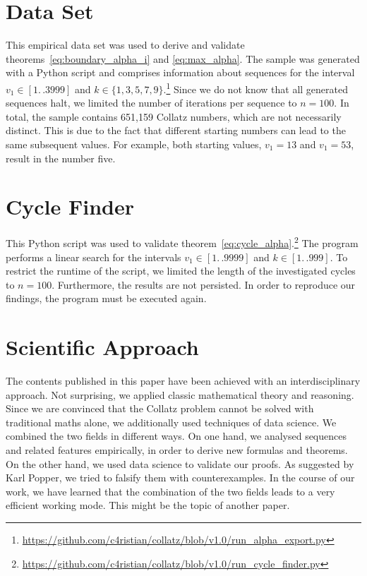 \documentclass{SciPress_2015}
\begin{document}
\section{Data Set}
\label{appx:data_set}
This empirical data set was used to derive and validate theorems~\ref{eq:boundary_alpha_i} and \ref{eq:max_alpha}. The sample was generated with a Python script and comprises information about sequences for the interval $v_1\in[1\mathrel{{.}\,{.}}3999]$ and $k\in\{1,3,5,7,9\}$.\footnote{\url{https://github.com/c4ristian/collatz/blob/v1.0/run_alpha_export.py}} Since we do not know that all generated sequences halt, we limited the number of iterations per sequence to $n=100$. In total, the sample contains 651,159 Collatz numbers, which are not necessarily distinct. This is due to the fact that different starting numbers can lead to the same subsequent values. For example, both starting values, $v_1=13$ and $v_1=53$, result in the number five.

\section{Cycle Finder}
\label{appx:cycle_finder}
This Python script was used to validate theorem~\ref{eq:cycle_alpha}.\footnote{\url{https://github.com/c4ristian/collatz/blob/v1.0/run_cycle_finder.py}} The program performs a linear search for the intervals $v_1\in[1\mathrel{{.}\,{.}}9999]$ and $k\in[1\mathrel{{.}\,{.}}999]$. To restrict the runtime of the script, we limited the length of the investigated cycles to $n=100$. Furthermore, the results are not persisted. In order to reproduce our findings, the program must be executed again.

\section{Scientific Approach}
\label{appx:scientific_approach}
The contents published in this paper have been achieved with an interdisciplinary approach. Not surprising, we applied classic mathematical theory and reasoning. Since we are convinced that the Collatz problem cannot be solved with traditional maths alone, we additionally used techniques of data science. We combined the two fields in different ways. On one hand, we analysed sequences and related features empirically, in order to derive new formulas and theorems. On the other hand, we used data science to validate our proofs. As suggested by Karl Popper, we tried to falsify them with counterexamples. In the course of our work, we have learned that the combination of the two fields leads to a very efficient working mode. This might be the topic of another paper.
\end{document}
